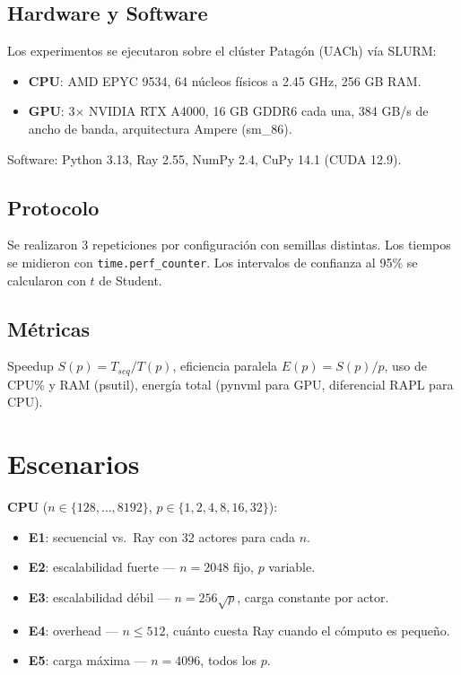 \documentclass[conference]{IEEEtran}
\begin{document}
\subsection{Hardware y Software}

Los experimentos se ejecutaron sobre el clúster Patagón (UACh) vía
SLURM:

\begin{itemize}
  \item \textbf{CPU}: AMD EPYC 9534, 64 núcleos físicos a 2.45 GHz,
        256 GB RAM.
  \item \textbf{GPU}: 3$\times$ NVIDIA RTX A4000, 16 GB GDDR6 cada una,
        384 GB/s de ancho de banda, arquitectura Ampere (sm\_86).
\end{itemize}

Software: Python 3.13, Ray 2.55, NumPy 2.4, CuPy 14.1 (CUDA 12.9).

\subsection{Protocolo}

Se realizaron 3 repeticiones por configuración con semillas distintas.
Los tiempos se midieron con \texttt{time.perf\_counter}. Los intervalos
de confianza al 95\% se calcularon con $t$ de Student.

\subsection{Métricas}

Speedup $S(p) = T_{seq}/T(p)$, eficiencia paralela $E(p) = S(p)/p$,
uso de CPU\% y RAM (psutil), energía total (pynvml para GPU,
diferencial RAPL para CPU).

\section{Escenarios}
\label{sec:escenarios}

\textbf{CPU} ($n \in \{128,\ldots,8192\}$, $p \in \{1,2,4,8,16,32\}$):

\begin{itemize}
  \item \textbf{E1}: secuencial vs.\ Ray con 32 actores para cada $n$.
  \item \textbf{E2}: escalabilidad fuerte — $n=2048$ fijo, $p$ variable.
  \item \textbf{E3}: escalabilidad débil — $n = 256\sqrt{p}$, carga
        constante por actor.
  \item \textbf{E4}: overhead — $n \leq 512$, cuánto cuesta Ray cuando
        el cómputo es pequeño.
  \item \textbf{E5}: carga máxima — $n=4096$, todos los $p$.
\end{itemize}
\end{document}
